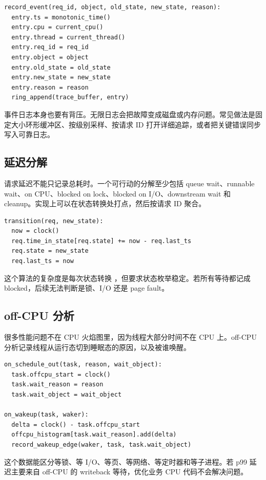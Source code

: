 \begin{lstlisting}
record_event(req_id, object, old_state, new_state, reason):
  entry.ts = monotonic_time()
  entry.cpu = current_cpu()
  entry.thread = current_thread()
  entry.req_id = req_id
  entry.object = object
  entry.old_state = old_state
  entry.new_state = new_state
  entry.reason = reason
  ring_append(trace_buffer, entry)
\end{lstlisting}

事件日志本身也要有背压。无限日志会把故障变成磁盘或内存问题。常见做法是固定大小环形缓冲区、按级别采样、按请求 ID 打开详细追踪，或者把关键错误同步写入可靠日志。

\subsection{延迟分解}

请求延迟不能只记录总耗时。一个可行动的分解至少包括 queue wait、runnable wait、on CPU、blocked on lock、blocked on I/O、downstream wait 和 cleanup。实现上可以在状态转换处打点，然后按请求 ID 聚合。

\begin{lstlisting}
transition(req, new_state):
  now = clock()
  req.time_in_state[req.state] += now - req.last_ts
  req.state = new_state
  req.last_ts = now
\end{lstlisting}

这个算法的复杂度是每次状态转换 ，但要求状态枚举稳定。若所有等待都记成 blocked，后续无法判断是锁、I/O 还是 page fault。

\subsection{off-CPU 分析}

很多性能问题不在 CPU 火焰图里，因为线程大部分时间不在 CPU 上。off-CPU 分析记录线程从运行态切到睡眠态的原因，以及被谁唤醒。

\begin{lstlisting}
on_schedule_out(task, reason, wait_object):
  task.offcpu_start = clock()
  task.wait_reason = reason
  task.wait_object = wait_object

on_wakeup(task, waker):
  delta = clock() - task.offcpu_start
  offcpu_histogram[task.wait_reason].add(delta)
  record_wakeup_edge(waker, task, task.wait_object)
\end{lstlisting}

这个数据能区分等锁、等 I/O、等页、等网络、等定时器和等子进程。若 p99 延迟主要来自 off-CPU 的 writeback 等待，优化业务 CPU 代码不会解决问题。


